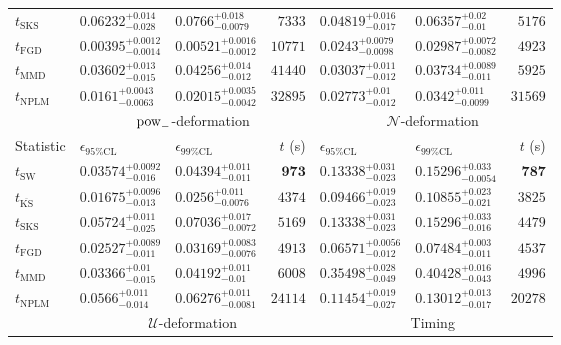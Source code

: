 \begin{tabular}{l|llr|llr}
	$t_{\mathrm{SKS}}$ & $0.06232_{-0.028}^{+0.014}$ & $0.0766_{-0.0079}^{+0.018}$ & $7333$ & $0.04819_{-0.017}^{+0.016}$ & $0.06357_{-0.01}^{+0.02}$ & $5176$ \\
	$t_{\mathrm{FGD}}$ & ${\mathbf{0.00395_{-0.0014}^{+0.0012}}}$ & ${\mathbf{0.00521_{-0.0012}^{+0.0016}}}$ & $10771$ & $0.0243_{-0.0098}^{+0.0079}$ & $0.02987_{-0.0082}^{+0.0072}$ & $4923$ \\
	$t_{\mathrm{MMD}}$ & $0.03602_{-0.015}^{+0.013}$ & $0.04256_{-0.012}^{+0.014}$ & $41440$ & $0.03037_{-0.012}^{+0.011}$ & $0.03734_{-0.011}^{+0.0089}$ & $5925$ \\
\rowcolor{red!35}	$t_{\mathrm{NPLM}}$ & $0.0161_{-0.0063}^{+0.0043}$ & $0.02015_{-0.0042}^{+0.0035}$ & $32895$ & $0.02773_{-0.012}^{+0.01}$ & $0.0342_{-0.0099}^{+0.011}$ & $31569$ \\
	\toprule
	\multicolumn{1}{c}{} & \multicolumn{3}{c}{$\rm{pow}_{-}$-deformation} & \multicolumn{3}{c}{$\mathcal{N}$-deformation} \\
Statistic & $\epsilon_{95\%\mathrm{CL}}$ & $\epsilon_{99\%\mathrm{CL}}$ & $t$ (s) & $\epsilon_{95\%\mathrm{CL}}$ & $\epsilon_{99\%\mathrm{CL}}$ & $t$ (s) \\
	\midrule
	$t_{\mathrm{SW}}$ & $0.03574_{-0.016}^{+0.0092}$ & $0.04394_{-0.011}^{+0.011}$ & ${\mathbf{973}}$ & $0.13338_{-0.023}^{+0.031}$ & $0.15296_{-0.0054}^{+0.033}$ & ${\mathbf{787}}$ \\
	$t_{\overline{\mathrm{KS}}}$ & ${\mathbf{0.01675_{-0.013}^{+0.0096}}}$ & ${\mathbf{0.0256_{-0.0076}^{+0.011}}}$ & $4374$ & $0.09466_{-0.023}^{+0.019}$ & $0.10855_{-0.021}^{+0.023}$ & $3825$ \\
	$t_{\mathrm{SKS}}$ & $0.05724_{-0.025}^{+0.011}$ & $0.07036_{-0.0072}^{+0.017}$ & $5169$ & $0.13338_{-0.023}^{+0.031}$ & $0.15296_{-0.016}^{+0.033}$ & $4479$ \\
	$t_{\mathrm{FGD}}$ & $0.02527_{-0.011}^{+0.0089}$ & $0.03169_{-0.0076}^{+0.0083}$ & $4913$ & ${\mathbf{0.06571_{-0.012}^{+0.0056}}}$ & ${\mathbf{0.07484_{-0.011}^{+0.003}}}$ & $4537$ \\
	$t_{\mathrm{MMD}}$ & $0.03366_{-0.015}^{+0.01}$ & $0.04192_{-0.01}^{+0.011}$ & $6008$ & $0.35498_{-0.049}^{+0.028}$ & $0.40428_{-0.043}^{+0.016}$ & $4996$ \\
\rowcolor{red!35}	$t_{\mathrm{NPLM}}$ & $0.0566_{-0.014}^{+0.011}$ & $0.06276_{-0.0081}^{+0.011}$ & $24114$ & $0.11454_{-0.027}^{+0.019}$ & $0.13012_{-0.017}^{+0.013}$ & $20278$ \\
	\toprule
	\multicolumn{1}{c}{} & \multicolumn{3}{c}{$\mathcal{U}$-deformation} & \multicolumn{3}{c}{Timing} \\

\end{tabular}
